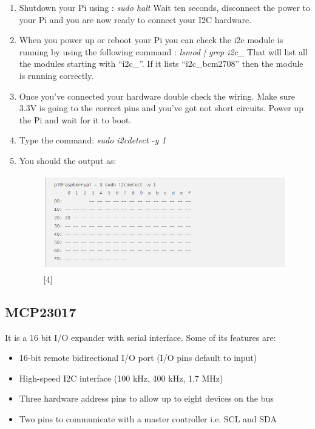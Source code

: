 \documentclass[11pt,a4paper]{article}
\begin{document}
\begin{enumerate}
		\item Shutdown your Pi using : \newline \textit{sudo halt} \newline Wait ten seconds, disconnect the power to your Pi and you are now ready to connect your I2C hardware.
		\item When you power up or reboot your Pi you can check the i2c module is running by using the following command : \newline \textit{lsmod | grep i2c\_} \newline That will list all the modules starting with “i2c\_”. If it lists “i2c\_bcm2708” then the module is running correctly.
		\item Once you’ve connected your hardware double check the wiring. Make sure 3.3V is going to the correct pins and you’ve got not short circuits. Power up the Pi and wait for it to boot.
		\item Type the command: \newline \textit{sudo i2cdetect -y 1} 
		\item You should the output as:
			\begin{figure}[h!]
				\includegraphics[scale=0.6]{i2c_9.png}
				\centering
				\caption{[4]}
			\end{figure}	
	\end{enumerate}
	
	\newpage
	\subsection{MCP23017}
	It is a 16 bit I/O expander with serial interface. Some of its features are:
	\begin{itemize}
		\item 16-bit remote bidirectional I/O port (I/O pins default to input)
		\item High-speed I2C interface (100 kHz, 400 kHz, 1.7 MHz)
		\item Three hardware address pins to allow up to eight devices on the bus
		\item Two pins to communicate with a master controller i.e. SCL and SDA
	\end{itemize}
	
\end{document}
